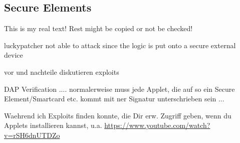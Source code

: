 \subsection{Secure Elements}\label{subsection:evaluation-external-secure}
This is my real text! Rest might be copied or not be checked!

luckypatcher not able to attack since the logic is put onto a secure external device

vor und nachteile diskutieren
exploits


DAP Verification .... normalerweise muss jede Applet, die auf so ein Secure Element/Smartcard etc. kommt mit ner Signatur unterschrieben sein ...


Waehrend ich Exploits finden konnte, die Dir erw. Zugriff geben, wenn du Applets installieren kannst, u.a.
\url{https://www.youtube.com/watch?v=rSH6dnUTDZo}
